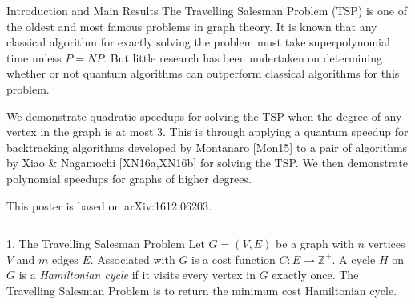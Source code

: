 \documentclass[]{templates/poster}
\begin{document}

\begin{frame}{} 

\begin{columns}[t]
  \begin{column}{0.900\linewidth}
  \begin{block}{\Large Introduction and Main Results}
  The Travelling Salesman Problem (TSP) is one of the oldest and most famous problems in graph theory. It is known that any classical algorithm for exactly solving the problem must take superpolynomial time unless $P = NP$. But little research has been undertaken on determining whether or not quantum algorithms can outperform classical algorithms for this problem.
  
  We demonstrate quadratic speedups for solving the TSP when the degree of any vertex in the graph is at most $3$. This is through applying a quantum speedup for backtracking algorithms developed by Montanaro [Mon15] to a pair of algorithms by Xiao \& Nagamochi [XN16a,XN16b] for solving the TSP. We then demonstrate polynomial speedups for graphs of higher degrees. 
  
  This poster is based on arXiv:1612.06203.
  \end{block}
  \end{column}
\end{columns}

\begin{columns}[t]
  \begin{column}{0.422\linewidth}
  \begin{block}{\Large 1. The Travelling Salesman Problem}
  Let $G = (V, E)$ be a graph with $n$ vertices $V$ and $m$ edges $E$. Associated with $G$ is a cost function $C \colon E \rightarrow \mathbb{Z}^+$. A cycle $H$ on $G$ is a {\em Hamiltonian cycle} if it visits every vertex in $G$ exactly once. The Travelling Salesman Problem is to return the minimum cost Hamiltonian cycle.
  

\end{block}
\end{column}
\end{columns}
\end{frame}
\end{document}
